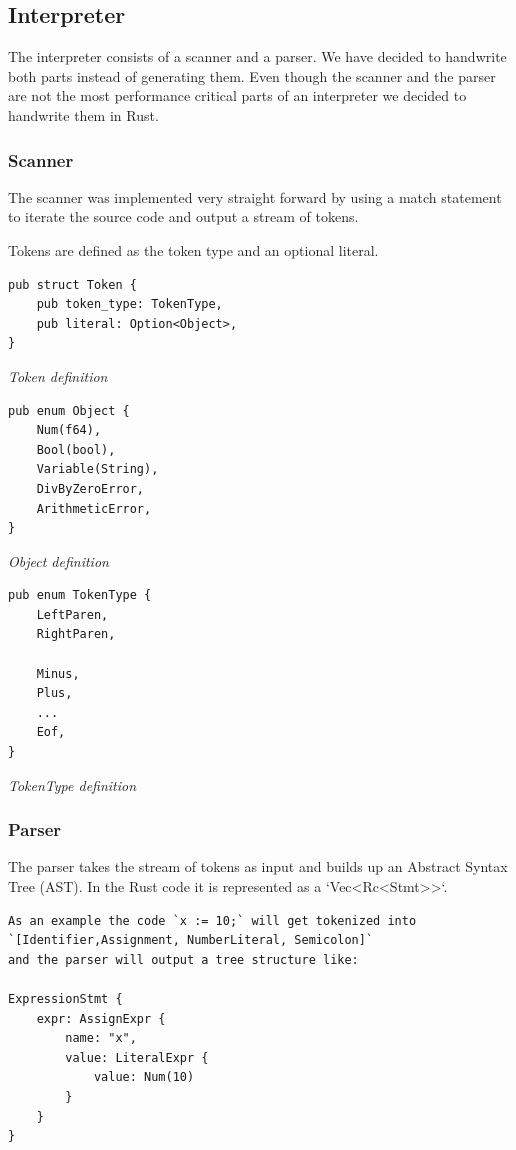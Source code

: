\documentclass{article}
\begin{document}

\subsection{Interpreter}
The interpreter consists of a scanner and a parser. We have decided to
handwrite both parts instead of generating them. Even though the scanner and
the parser are not the most performance critical parts of an interpreter we
decided to handwrite them in Rust.

\subsubsection{Scanner}
The scanner was implemented very straight forward by using a match statement 
to iterate the source code and output a stream of tokens.

Tokens are defined as the token type and an optional literal.

\begin{verbatim}
pub struct Token {
    pub token_type: TokenType,
    pub literal: Option<Object>,
}
\end{verbatim}
\textit{Token definition}

\begin{verbatim}
pub enum Object {
    Num(f64),
    Bool(bool),
    Variable(String),
    DivByZeroError,
    ArithmeticError,
}
\end{verbatim}
\textit{Object definition}

\begin{verbatim}
pub enum TokenType {
    LeftParen,
    RightParen,

    Minus,
    Plus,
    ...
    Eof,
}
\end{verbatim}
\textit{TokenType definition}

\subsubsection{Parser}
The parser takes the stream of tokens as input and builds up an Abstract Syntax
Tree (AST). In the Rust code it is represented as a `Vec<Rc<Stmt>>`.

\begin{verbatim}
As an example the code `x := 10;` will get tokenized into 
`[Identifier,Assignment, NumberLiteral, Semicolon]` 
and the parser will output a tree structure like:

ExpressionStmt {
    expr: AssignExpr {
        name: "x",
        value: LiteralExpr {
            value: Num(10)
        }
    }
}
\end{verbatim}
\end{document}
